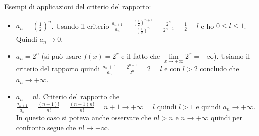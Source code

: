 \begin{example}
Esempi di applicazioni del criterio del rapporto:
\begin{itemize}
    \item $a_n = (\frac{1}{2})^n$. Usando il criterio $\frac{a_{n+1}}{a_n} = \frac{(\frac{1}{2})^{n+1}}{(\frac{1}{2})^n} = \frac{2^n}{2^{n+1}} = \frac{1}{2} = l$ e ho $0 \leq l \leq 1$. Quindi $a_n \to 0$.
    \item $a_n = 2^n$ (si può usare $f(x) = 2^x$ e il fatto che $\lim\limits_{x\to +\infty}2^x = +\infty$). Usiamo il criterio del rapporto quindi $\frac{a_n+1}{a_n} = \frac{2^{n+1}}{2^n} = 2 = l$ e con $l>2$ concludo che $a_n \to +\infty$.
    \item $a_n = n!$. Criterio del rapporto che $\frac{a_{n+1}}{a_n} = \frac{(n+1)!}{n!} = \frac{(n+1)n!}{n!} = n+1 \to +\infty = l$ quindi $l>1$ e quindi $a_n \to +\infty$. In questo caso si poteva anche osservare che $n! > n$ e $n \to +\infty$ quindi per confronto segue che $n! \to +\infty$.
\end{itemize}
\end{example}

